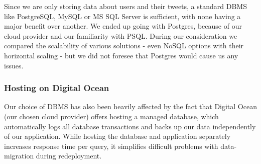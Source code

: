 Since we are only storing data about users and their tweets, a standard DBMS like PostgreSQL, MySQL or MS SQL Server is sufficient, with none having a major benefit over another. We ended up going with Postgres, because of our cloud provider and our familiarity with PSQL. During our consideration we compared the scalability of various solutions - even NoSQL options with their horizontal scaling - but we did not foresee that Postgres would cause us any issues.

\subsubsection{Hosting on Digital Ocean}
Our choice of DBMS has also been heavily affected by the fact that Digital Ocean (our chosen cloud provider) offers hosting a managed database, which automatically logs all database transactions and backs up our data independently of our application. While hosting the database and application separately increases response time per query, it simplifies difficult problems with data-migration during redeployment.